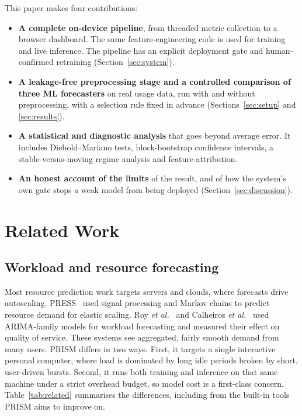 \documentclass[conference]{IEEEtran}
\begin{document}
This paper makes four contributions:
\begin{itemize}
  \item \textbf{A complete on-device pipeline}, from threaded metric
        collection to a browser dashboard. The same
        feature-engineering code is used for training and live inference.
        The pipeline has an explicit deployment gate and human-confirmed
        retraining (Section~\ref{sec:system}).
  \item \textbf{A leakage-free preprocessing stage and a controlled
        comparison of three ML forecasters} on real usage data, run with and
        without preprocessing, with a selection rule fixed in advance
        (Sections~\ref{sec:setup} and \ref{sec:results}).
  \item \textbf{A statistical and diagnostic analysis} that goes beyond
        average error. It includes Diebold--Mariano tests, block-bootstrap
        confidence intervals, a stable-versus-moving regime analysis and
        feature attribution.
  \item \textbf{An honest account of the limits} of the result, and of how
        the system's own gate stops a weak model from being deployed
        (Section~\ref{sec:discussion}).
\end{itemize}

\section{Related Work}
\subsection{Workload and resource forecasting}
Most resource prediction work targets servers and clouds, where forecasts
drive autoscaling. PRESS~\cite{gong2010press} used signal processing and
Markov chains to predict resource demand for elastic scaling.
Roy \emph{et al.}~\cite{roy2011autoscaling} and Calheiros
\emph{et al.}~\cite{calheiros2015arima} used ARIMA-family models for workload
forecasting and measured their effect on quality of service. These systems
see aggregated, fairly smooth demand from many users. PRISM differs in two
ways. First, it targets a single interactive personal computer, where load is
dominated by long idle periods broken by short, user-driven bursts. Second, it
runs both training and inference on that same machine under a strict overhead
budget, so model cost is a first-class concern. Table~\ref{tab:related}
summarises the differences, including from the built-in tools PRISM aims to
improve on.
\end{document}
